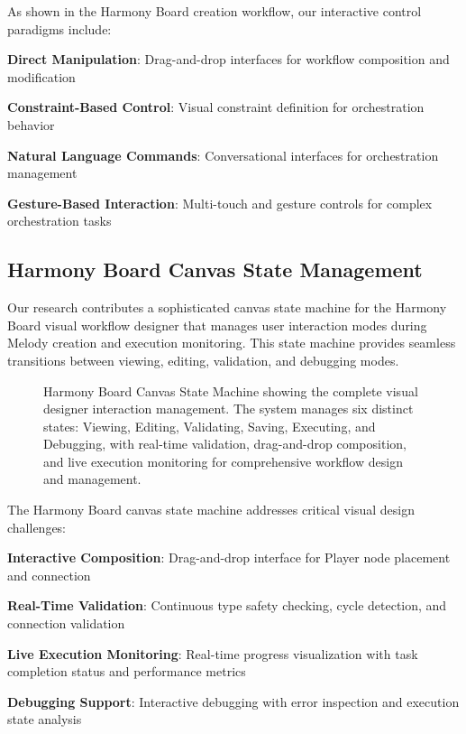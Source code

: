 As shown in the Harmony Board creation workflow, our interactive control paradigms include:

\begin{expandedlist}
    \item \textbf{Direct Manipulation}: Drag-and-drop interfaces for workflow composition and modification
    \item \textbf{Constraint-Based Control}: Visual constraint definition for orchestration behavior
    \item \textbf{Natural Language Commands}: Conversational interfaces for orchestration management
    \item \textbf{Gesture-Based Interaction}: Multi-touch and gesture controls for complex orchestration tasks
\end{expandedlist}

\subsection*{Harmony Board Canvas State Management}

Our research contributes a sophisticated canvas state machine for the Harmony Board visual workflow designer that manages user interaction modes during Melody creation and execution monitoring. This state machine provides seamless transitions between viewing, editing, validation, and debugging modes.

\begin{figure}[h]
\centering
\caption{Harmony Board Canvas State Machine showing the complete visual designer interaction management. The system manages six distinct states: Viewing, Editing, Validating, Saving, Executing, and Debugging, with real-time validation, drag-and-drop composition, and live execution monitoring for comprehensive workflow design and management.}
\label{fig:harmony-board-canvas-states}
\end{figure}

The Harmony Board canvas state machine addresses critical visual design challenges:

\begin{expandedlist}
    \item \textbf{Interactive Composition}: Drag-and-drop interface for Player node placement and connection
    \item \textbf{Real-Time Validation}: Continuous type safety checking, cycle detection, and connection validation
    \item \textbf{Live Execution Monitoring}: Real-time progress visualization with task completion status and performance metrics
    \item \textbf{Debugging Support}: Interactive debugging with error inspection and execution state analysis
\end{expandedlist}


